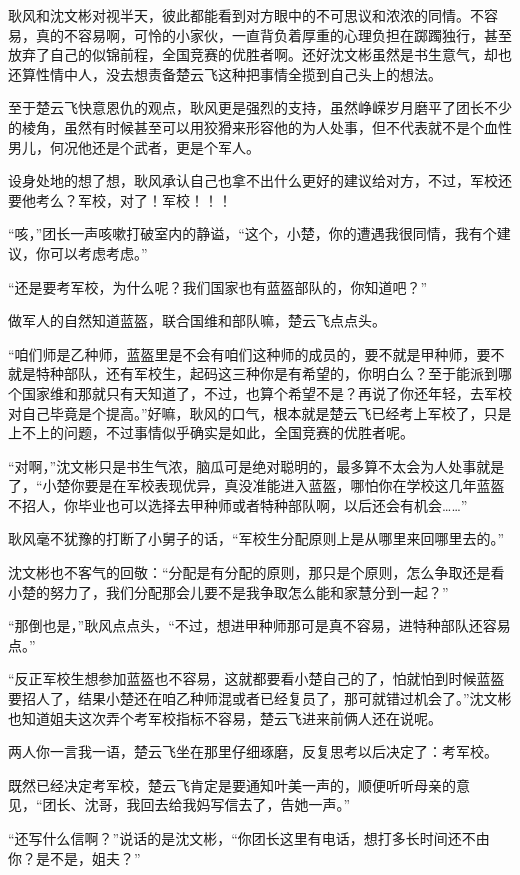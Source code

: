 耿风和沈文彬对视半天，彼此都能看到对方眼中的不可思议和浓浓的同情。不容易，真的不容易啊，可怜的小家伙，一直背负着厚重的心理负担在踯躅独行，甚至放弃了自己的似锦前程，全国竞赛的优胜者啊。还好沈文彬虽然是书生意气，却也还算性情中人，没去想责备楚云飞这种把事情全揽到自己头上的想法。

至于楚云飞快意恩仇的观点，耿风更是强烈的支持，虽然峥嵘岁月磨平了团长不少的棱角，虽然有时候甚至可以用狡猾来形容他的为人处事，但不代表就不是个血性男儿，何况他还是个武者，更是个军人。

设身处地的想了想，耿风承认自己也拿不出什么更好的建议给对方，不过，军校还要他考么？军校，对了！军校！！！

“咳，”团长一声咳嗽打破室内的静谥，“这个，小楚，你的遭遇我很同情，我有个建议，你可以考虑考虑。”

“还是要考军校，为什么呢？我们国家也有蓝盔部队的，你知道吧？”

做军人的自然知道蓝盔，联合国维和部队嘛，楚云飞点点头。

“咱们师是乙种师，蓝盔里是不会有咱们这种师的成员的，要不就是甲种师，要不就是特种部队，还有军校生，起码这三种你是有希望的，你明白么？至于能派到哪个国家维和那就只有天知道了，不过，也算个希望不是？再说了你还年轻，去军校对自己毕竟是个提高。”好嘛，耿风的口气，根本就是楚云飞已经考上军校了，只是上不上的问题，不过事情似乎确实是如此，全国竞赛的优胜者呢。

“对啊，”沈文彬只是书生气浓，脑瓜可是绝对聪明的，最多算不太会为人处事就是了，“小楚你要是在军校表现优异，真没准能进入蓝盔，哪怕你在学校这几年蓝盔不招人，你毕业也可以选择去甲种师或者特种部队啊，以后还会有机会……”

耿风毫不犹豫的打断了小舅子的话，“军校生分配原则上是从哪里来回哪里去的。”

沈文彬也不客气的回敬：“分配是有分配的原则，那只是个原则，怎么争取还是看小楚的努力了，我们分配那会儿要不是我争取怎么能和家慧分到一起？”

“那倒也是，”耿风点点头，“不过，想进甲种师那可是真不容易，进特种部队还容易点。”

“反正军校生想参加蓝盔也不容易，这就都要看小楚自己的了，怕就怕到时候蓝盔要招人了，结果小楚还在咱乙种师混或者已经复员了，那可就错过机会了。”沈文彬也知道姐夫这次弄个考军校指标不容易，楚云飞进来前俩人还在说呢。

两人你一言我一语，楚云飞坐在那里仔细琢磨，反复思考以后决定了：考军校。

既然已经决定考军校，楚云飞肯定是要通知叶美一声的，顺便听听母亲的意见，“团长、沈哥，我回去给我妈写信去了，告她一声。”

“还写什么信啊？”说话的是沈文彬，“你团长这里有电话，想打多长时间还不由你？是不是，姐夫？”

